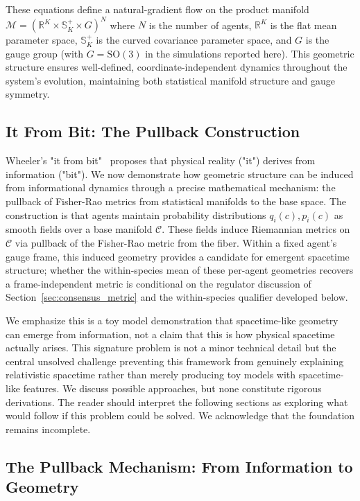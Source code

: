 \documentclass[11pt]{article}
\begin{document}
These equations define a natural-gradient flow on the product manifold $\mathcal{M} = (\mathbb{R}^K \times \mathbb{S}^+_K \times G)^N$ where $N$ is the number of agents, $\mathbb{R}^K$ is the flat mean parameter space, $\mathbb{S}^+_K$ is the curved covariance parameter space, and $G$ is the gauge group (with $G = \mathrm{SO}(3)$ in the simulations reported here). This geometric structure ensures well-defined, coordinate-independent dynamics throughout the system's evolution, maintaining both statistical manifold structure and gauge symmetry.

\subsection{It From Bit: The Pullback Construction}
\label{sec:pullback}

Wheeler's "it from bit"~\cite{Wheeler1990} proposes that physical reality ("it") derives from information ("bit"). We now demonstrate how geometric structure can be induced from informational dynamics through a precise mathematical mechanism: the pullback of Fisher-Rao metrics from statistical manifolds to the base space. The construction is that agents maintain probability distributions $q_i(c), p_i(c)$ as smooth fields over a base manifold $\mathcal{C}$. These fields induce Riemannian metrics on $\mathcal{C}$ via pullback of the Fisher-Rao metric from the fiber. Within a fixed agent's gauge frame, this induced geometry provides a candidate for emergent spacetime structure; whether the within-species mean of these per-agent geometries recovers a frame-independent metric is conditional on the regulator discussion of Section~\ref{sec:consensus_metric} and the within-species qualifier developed below.

We emphasize this is a toy model demonstration that spacetime-like geometry can emerge from information, not a claim that this is how physical spacetime actually arises. This signature problem is not a minor technical detail but the central unsolved challenge preventing this framework from genuinely explaining relativistic spacetime rather than merely producing toy models with spacetime-like features. We discuss possible approaches, but none constitute rigorous derivations. The reader should interpret the following sections as exploring what would follow if this problem could be solved. We acknowledge that the foundation remains incomplete.

\subsection{The Pullback Mechanism: From Information to Geometry}
\end{document}
